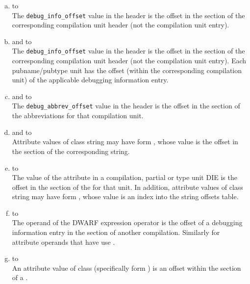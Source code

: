 \begin{enumerate}[(a)]  
\item  \dotdebugaranges{} to \dotdebuginfo \\
The \texttt{debug\_info\_offset} value in
the header is
the offset in the \dotdebuginfo{} section of the
corresponding compilation unit header (not the compilation
unit entry).

\item \dotdebugpubnames{} and \dotdebugpubtypes{} to \dotdebuginfo \\
The \texttt{debug\_info\_offset} value in the header is the offset in the
\dotdebuginfo{} section of the 
corresponding compilation unit header (not
the compilation unit entry). Each pubname/pubtype unit has the offset (within
the corresponding compilation unit) of the applicable debugging
information entry.

\item \dotdebuginfo{} and \dotdebugtypes{} to \dotdebugabbrev \\
The \texttt{debug\_abbrev\_offset} value in the header is the offset in the
\dotdebugabbrev{} 
section of the abbreviations for that compilation unit.

\item  \dotdebuginfo{} and \dotdebugtypes{} to \dotdebugstr \\
Attribute values of class string may have form 
\DWFORMstrp, whose
value is the offset in the \dotdebugstr{}
section of the corresponding string.

\item \dotdebugstroffsets{} to \dotdebugstroffsets \\
The value of the \DWATstroffsetsbase{} attribute in a
compilation, partial or type unit DIE is the offset in the
\dotdebugstroffsets{} section of the 
for that unit.
In addition, attribute values of class string may have form 
\DWFORMstrx, whose value is an index into the
string offsets table.

\item \dotdebuginfo{} to \dotdebuginfo \\
The operand of the \DWOPcallref{} 
DWARF expression operator is the
offset of a debugging information entry in the 
\dotdebuginfo{} section of another compilation.
Similarly for attribute operands that have use
\DWFORMrefaddr.

\item \dotdebuginfo{} to \dotdebugloc \\
An attribute value of class  
(specifically form
\DWFORMsecoffset) 
is an offset within the \dotdebugloc{} 
section of a
.


\end{enumerate}
